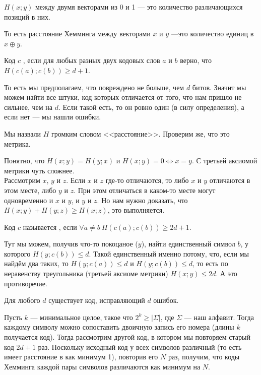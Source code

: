 \documentclass{article}
\begin{document}
\begin{itemize}
        \dfn {} $H(x;y)$ между двумя векторами из 0 и 1 --- это количество различающихся позиций в них.
        \begin{Comment}
            То есть расстояние Хемминга между векторами $x$ и $y$ ---это количество единиц в $x\oplus y$.
        \end{Comment}
        \dfn Код $c$ , если для любых разных двух кодовых слов $a$ и $b$ верно, что $H(c(a);c(b))\geqslant d+1$.
        \begin{Comment}
            То есть мы предполагаем, что повреждено не больше, чем $d$ битов. Значит мы можем найти все штуки, код которых отличается от того, что нам пришло не сильнее, чем на $d$. Если такой есть, то он ровно один (в силу определения), а если нет --- мы нашли ошибки.
        \end{Comment}
        \thm Мы назвали $H$ громким словом <<расстояние>>. Проверим же, что это метрика.
        \begin{Proof}
            Понятно, что $H(x;y)=H(y;x)$ и $H(x;y)=0\Leftrightarrow x=y$. С третьей аксиомой метрики чуть сложнее.\\
            Рассмотрим $x$, $y$ и $z$.
            Если $x$ и $z$ где-то отличаются, то либо $x$ и $y$ отличаются в этом месте, либо $y$ и $z$. При этом отличаться в каком-то месте могут одновременно и $x$ и $y$, и $y$ и $z$. Но нам нужно доказать, что $H(x;y)+H(y;z)\geqslant H(x;z)$, это выполняется.
        \end{Proof}
        \dfn Код $c$ называется , если $\forall a\neq b~H(c(a);c(b))\geqslant2d+1$.
        \begin{Comment}
            Тут мы можем, получив что-то покоцаное ($y$), найти единственный символ $b$, у которого $H(y;c(b))\leqslant d$. Такой единственный именно потому, что, если мы найдём два таких, то $H(y;c(a))\leqslant d$ и $H(y;c(b))\leqslant d$, то есть по неравенству треугольника (третьей аксиоме метрики) $H(x;y)\leqslant2d$. А это противоречие.
        \end{Comment}
        \thm Для любого $d$ существует код, исправляющий $d$ ошибок.
        \begin{Proof}
            Пусть $k$ --- минимальное целое, такое что $2^k\geqslant|\Sigma|$, где $\Sigma$ --- наш алфавит. Тогда каждому символу можно сопоставить двоичную запись его номера (длины $k$ получается код). Тогда рассмотрим другой код, в котором мы повторяем старый код $2d+1$ раз. Поскольку исходный код у всех символов различный (то есть имеет расстояние в как минимум 1), повторив его $N$ раз, получим, что коды Хемминга каждой пары символов различаются как минимум на $N$.

\end{Proof}
\end{itemize}
\end{document}
